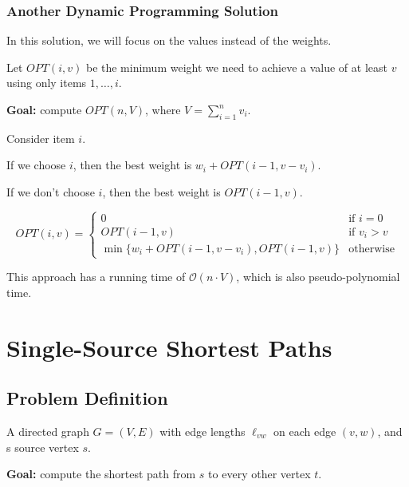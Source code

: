 \subsubsection{Another Dynamic Programming Solution}

In this solution, we will focus on the values instead of the weights.

\begin{listu}
    \item Let $OPT(i, v)$ be the minimum weight we need to achieve a value of at least $v$ using only items $1, \dots, i$.

    \textbf{Goal:} compute $OPT(n, V)$, where $V = \sum_{i=1}^n v_i$.

    \item Consider item $i$.

    \begin{listu}
        \item If we choose $i$, then the best weight is $w_i + OPT(i - 1, v - v_i)$.
        \item If we don't choose $i$, then the best weight is $OPT(i - 1, v)$.
    \end{listu}
\end{listu} \[
    OPT(i, v) = \begin{cases}
        0                                                & \text{if } i = 0   \\
        OPT(i - 1, v)                                    & \text{if } v_i > v \\
        \min\{w_i + OPT(i - 1, v - v_i), OPT(i - 1, v)\} & \text{otherwise}
    \end{cases}
\]

This approach has a running time of $\mathcal{O}(n \cdot V)$, which is also pseudo-polynomial time.


\section{Single-Source Shortest Paths}

\subsection{Problem Definition}

\begin{listu}
    \item A directed graph $G = (V, E)$ with edge lengths $\ell_{vw}$ on each edge $(v, w)$, and s source vertex $s$.
    \item \textbf{Goal:} compute the shortest path from $s$ to every other vertex $t$.
\end{listu}

